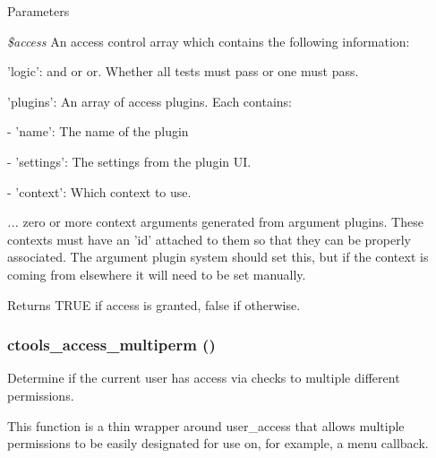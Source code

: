\begin{DoxyParams}{Parameters}
\item[{\em \$access}]An access control array which contains the following information:
\begin{DoxyItemize}
\item 'logic': and or or. Whether all tests must pass or one must pass.
\item 'plugins': An array of access plugins. Each contains:
\item -\/ 'name': The name of the plugin
\item -\/ 'settings': The settings from the plugin UI.
\item -\/ 'context': Which context to use. 
\end{DoxyItemize}\item[{\em ...}]zero or more context arguments generated from argument plugins. These contexts must have an 'id' attached to them so that they can be properly associated. The argument plugin system should set this, but if the context is coming from elsewhere it will need to be set manually.\end{DoxyParams}
\begin{DoxyReturn}{Returns}
TRUE if access is granted, false if otherwise. 
\end{DoxyReturn}
\hypertarget{ctools_8module_a5fa148b37edfc92192dcf6eb22299d5c}{
\subsubsection[{ctools\_\-access\_\-multiperm}]{\setlength{\rightskip}{0pt plus 5cm}ctools\_\-access\_\-multiperm ()}}
\label{ctools_8module_a5fa148b37edfc92192dcf6eb22299d5c}
Determine if the current user has access via checks to multiple different permissions.

This function is a thin wrapper around user\_\-access that allows multiple permissions to be easily designated for use on, for example, a menu callback.


